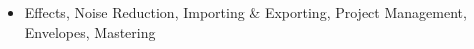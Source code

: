 \def\dMon{Mon, 01/25}
\def\dTues{Tues, 01/26}
\def\dWed{Wed, 01/27}
\def\dThur{Thur, 01/28}
\def\dFri{Fri, 01/29}
\def\dSat{Sat, 01/30}
\def\dSun{Sun, 01/31}
\placeDate

\begin{itemize}[noitemsep,topsep=0pt,leftmargin=*]
	\item {} Effects, Noise Reduction, Importing \& Exporting, Project Management, Envelopes, Mastering

\end{itemize}
